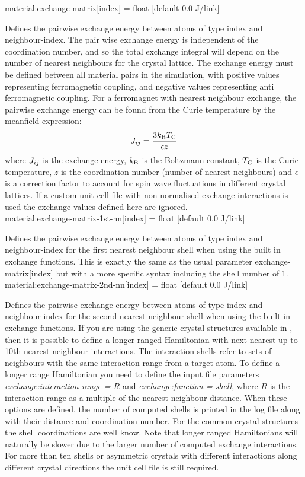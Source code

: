 {\zicf material:exchange-matrix[index] = float [default 0.0 J/link]}
 Defines the pairwise
exchange energy between atoms of type index and neighbour-index. The pair wise
exchange energy is independent of the coordination number, and so the total
exchange integral will depend on the number of nearest neighbours for the
crystal lattice. The exchange energy must be defined between all material pairs
in the simulation, with positive values representing ferromagnetic coupling, and
negative values representing anti ferromagnetic coupling. For a ferromagnet with
nearest neighbour exchange, the pairwise exchange energy can be found from the
Curie temperature by the meanfield expression:
\begin{equation*}
J_{ij} = \frac{3k_\mathrm{B}T_{\mathrm{C}}}{\epsilon z}
\end{equation*}
where $J_{ij}$ is the exchange energy, $k_\mathrm{B}$ is the Boltzmann constant, $T_{\mathrm{C}}$ is
 the Curie temperature, $z$ is the coordination number (number of nearest
 neighbours) and $\epsilon$ is a correction factor to account for spin wave
 fluctuations in different crystal lattices. If a custom unit cell file with
 non-normalised exchange interactions is used the exchange values defined here
 are ignored.\\

{\zicf material:exchange-matrix-1st-nn[index] = float [default 0.0 J/link]}
Defines the pairwise exchange energy between atoms of type index and
neighbour-index for the first nearest neighbour shell when using the built in
exchange functions. This is exactly the same as the usual parameter
exchange-matrix[index] but with a more specific syntax including the shell
number of 1.\\

{\zicf material:exchange-matrix-2nd-nn[index] = float [default 0.0 J/link]}
Defines the pairwise exchange energy between atoms of type index and
neighbour-index for the second nearest neighbour shell when using the built in
exchange functions. If you are using the generic crystal structures available in
 \vampire, then it is possible to define a longer ranged Hamiltonian with
 next-nearest up to 10th nearest neighbour interactions. The interaction shells
 refer to sets of neighbours with the same interaction range from a target atom.
 To define a longer range Hamiltonian you need to define the input file
 parameters \textit{exchange:interaction-range = $R$} and
 \textit{exchange:function = shell}, where $R$ is the interaction range as a
 multiple of the nearest neighbour distance. When these options are defined,
 the number of computed shells is printed in the log file along with their
 distance and coordination number. For the common crystal structures the shell
 coordinations are well know. Note that longer ranged Hamiltonians will
 naturally be slower due to the larger number of computed exchange interactions.
 For more than ten shells or asymmetric crystals with different interactions
 along different crystal directions the unit cell file is still required.\\


